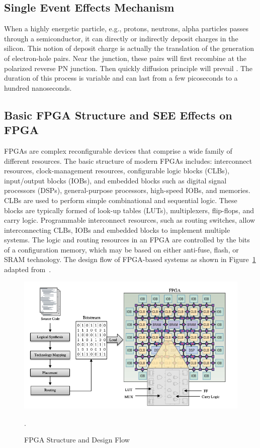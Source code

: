 \subsection{Single Event Effects Mechanism}


When a highly energetic particle, e.g., protons, neutrons, alpha particles passes through a semiconductor, it can directly or indirectly deposit charges in the silicon. This notion of deposit
charge is actually the translation of the generation of electron-hole pairs. Near the junction, these
pairs will first recombine at the polarized reverse PN junction.  Then quickly diffusion principle will prevail . The duration of this
process is variable and can last from a few picoseconds to a hundred
nanoseconds.


\subsection{Basic FPGA Structure and SEE Effects on FPGA}



FPGAs are complex reconfigurable devices that comprise a wide family of different resources. The basic structure of modern FPGAs includes: interconnect resources, clock-management resources, configurable logic blocks (CLBs), input/output
blocks (IOBs), and embedded blocks such as digital signal processors (DSPs), general-purpose processors, high-speed IOBs, and memories. CLBs are used to perform simple
combinational and sequential logic. These blocks are typically formed of look-up tables
(LUTs), multiplexers, flip-flops, and carry logic. Programmable interconnect resources, such
as routing switches, allow interconnecting CLBs, IOBs and embedded blocks to implement multiple systems.
The logic and routing resources in an FPGA are controlled by the bits of a configuration memory, which may be based on either anti-fuse, flash, or SRAM technology. The
design flow of FPGA-based systems as shown in Figure~\ref{fig:fpga-struct} adapted from~\citep{hauck2010reconfigurable}.



\begin{figure}[tb!]
 \centering
  \captionsetup{justification=centering}    
   \includegraphics[scale=0.4]{figures/img/FPGA-structure.png}
   \caption{FPGA Structure and Design Flow~\citep{manuzzato2010single}}.
\label{fig:fpga-struct}
\end{figure}




